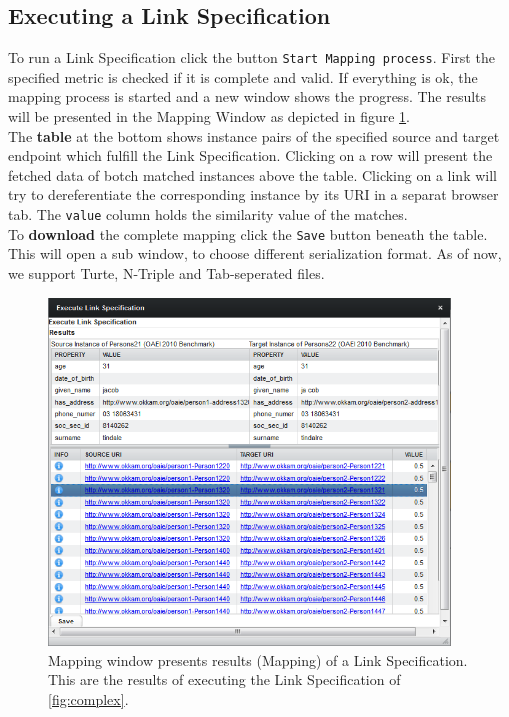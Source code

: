 \documentclass[oneside,a4paper,12pt]{memoir}
\begin{document}
\subsection{Executing a Link Specification}
To run a Link Specification click the button \texttt{Start Mapping process}. First the specified metric is checked if it is complete and valid. If everything is ok, the mapping process is started and a new window shows the progress. The results will be presented in the Mapping Window as depicted in figure \ref{fig:execution}.\\
 The \textbf{table} at the bottom shows instance pairs of the specified source and target endpoint which fulfill the Link Specification. Clicking on a row will present the fetched data of botch matched instances above the table. Clicking on a link will try to dereferentiate the corresponding instance by its URI in a separat browser tab. The \texttt{value} column holds the similarity value of the matches.\\To \textbf{download} the complete mapping click the \texttt{Save} button beneath the table. This will open a sub window, to choose different serialization format. As of now, we support Turte, N-Triple and Tab-seperated files.
 
 \begin{figure}[!ht]
		\centering
		\includegraphics[width=0.95\textwidth]{images/execution_window.png}
		\caption{Mapping window presents results (Mapping) of a Link Specification. This are the results of executing the Link Specification of \ref{fig:complex}.}
		\label{fig:execution}
	\end{figure}
\end{document}
